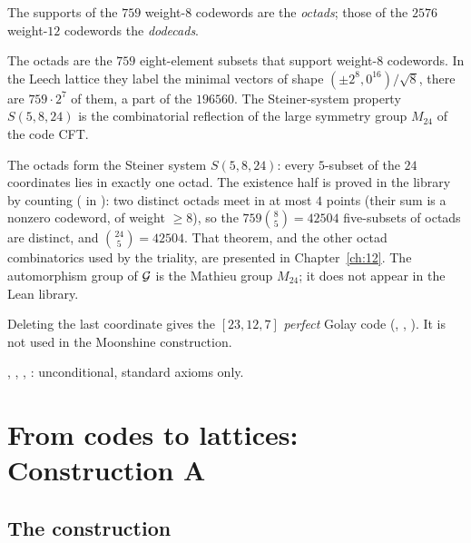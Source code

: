 \begin{definition}
The supports of the $759$ weight-$8$ codewords are the \emph{octads}; those of the $2576$
weight-$12$ codewords the \emph{dodecads}.
\end{definition}
\begin{physics}
The octads are the $759$ eight-element subsets that support weight-$8$ codewords. In the Leech lattice they label the minimal vectors of shape $(\pm2^8,0^{16})/\sqrt8$, there are $759\cdot2^7$ of them, a part of the $196560$. The Steiner-system property $S(5,8,24)$ is the combinatorial reflection of the large symmetry group $M_{24}$ of the code CFT.
\end{physics}
The octads form the Steiner system $S(5,8,24)$: every $5$-subset of the $24$ coordinates lies in
exactly one octad.  The existence half is proved in the library by counting
( in ): two
distinct octads meet in at most $4$ points (their sum is a nonzero codeword, of weight $\ge8$), so
the $759\binom85=42504$ five-subsets of octads are distinct, and $\binom{24}5=42504$.  That
theorem, and the other octad combinatorics used by the triality, are presented in
Chapter~\ref{ch:12}.  The automorphism group of $\mathcal{G}$ is the Mathieu group $M_{24}$; it does
not appear in the Lean library.

\begin{remark}
Deleting the last coordinate gives the $[23,12,7]$ \emph{perfect} Golay code
(, , ).  It is not used in
the Moonshine construction.
\end{remark}

\begin{status}
, ,
, : unconditional,
standard axioms only.
\end{status}

\section{From codes to lattices: Construction A}\label{ch02:sec:constructionA}

\subsection{The construction}

